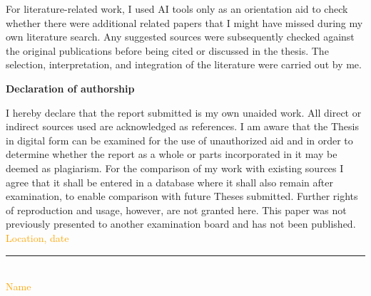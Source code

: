 \documentclass[12pt]{article}
\begin{document}
For literature-related work, I used AI tools only as an orientation aid to check
whether there were additional related papers that I might have missed during my
own literature search. Any suggested sources were subsequently checked against
the original publications before being cited or discussed in the thesis. The
selection, interpretation, and integration of the literature were carried out by
me.

\clearpage


\Large
\noindent
\textbf{Declaration of authorship} 
\vspace{0.5cm}
\noindent
\normalsize

I hereby declare that the report submitted is my own unaided work. All direct 
or indirect sources used are acknowledged as references. I am aware that the 
Thesis in digital form can be examined for the use of unauthorized aid and in 
order to determine whether the report as a whole or parts incorporated in it may 
be deemed as plagiarism. For the comparison of my work with existing sources I 
agree that it shall be entered in a database where it shall also remain after 
examination, to enable comparison with future Theses submitted. Further rights 
of reproduction and usage, however, are not granted here. This paper was not 
previously presented to another examination board and has not been published.
\\

\vspace{1cm}
\textcolor{orange}{Location, date} \\

\vspace{3cm}

\noindent\rule{0.5\textwidth}{0.4pt} \\

\textcolor{orange}{Name}

\end{document}
